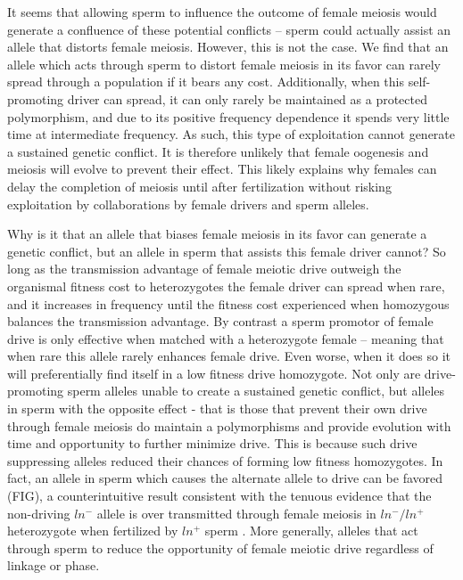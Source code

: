 \documentclass[12pt,letterpaper]{article}
\newcommand{\yb}[1]{{ \color{blue} #1}}
\begin{document}
It seems that allowing sperm to influence the outcome of female meiosis would generate a confluence of these potential conflicts -- 
	sperm could actually assist an allele that distorts female meiosis.
However, this is not the case.
We find that an allele which acts through sperm to distort female meiosis in its favor %
	can rarely spread through a population if it bears any cost. 
Additionally, when this self-promoting driver can spread, it can only rarely 
	be maintained as a protected polymorphism, and due to its positive frequency dependence 
	it spends very little time at intermediate frequency.
As such, this type of exploitation cannot generate a sustained genetic conflict.
It is therefore unlikely
	that female oogenesis and meiosis will evolve to prevent their effect.  
This likely explains why females can delay the completion of meiosis until after fertilization 
	without risking exploitation by collaborations by female
        drivers and sperm alleles.

Why is it that an allele that biases female meiosis in its favor can generate a genetic conflict, but an allele in sperm that assists this female driver cannot? 
So long as the transmission advantage of female meiotic drive outweigh the organismal fitness cost to heterozygotes the female driver can spread when rare, and it increases in 		
	frequency until the fitness cost experienced when homozygous balances the transmission advantage.
By contrast a sperm promotor of female drive is only effective when matched with a heterozygote female -- meaning that when rare this allele rarely enhances female drive. 
Even worse, when it does so it will preferentially find itself in a low fitness drive homozygote. 
Not only are drive-promoting sperm alleles unable to create a sustained genetic conflict, 
	but alleles in sperm with the opposite effect - that is those that prevent their own drive through female meiosis do maintain a polymorphisms and 
	provide evolution  with time and opportunity to further minimize drive.
This is because such drive suppressing alleles reduced their chances
of forming low fitness homozygotes. 
In fact, an allele in sperm which causes the alternate allele to drive can be favored (FIG), a counterintuitive result 
	consistent with the tenuous evidence that the non-driving
        $ln^-$ allele is over transmitted through female meiosis in $ln^-/ln^+$ heterozygote when fertilized by $ln^+$
        sperm \cite{agulnick, Pomiankowski1993}.   
More generally, alleles that act through sperm to
 reduce the opportunity of female meiotic drive regardless of linkage or phase. 
\end{document}
